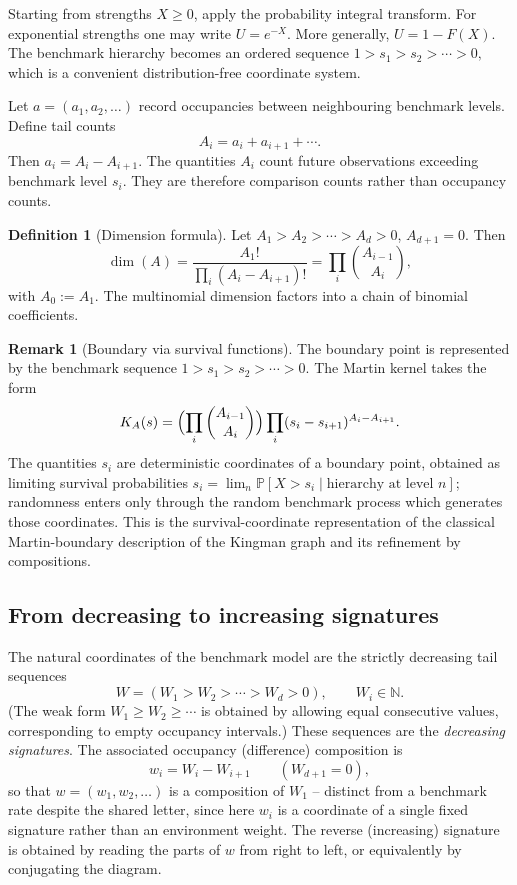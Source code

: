 \documentclass[11pt]{article}
\newcommand{\PP}{\mathbb{P}}
\theoremstyle{plain}
\theoremstyle{definition}
\newtheorem{definition}[theorem]{Definition}
\newtheorem{remark}[theorem]{Remark}
\begin{document}
Starting from strengths \(X\geq0\), apply the probability integral transform. For exponential strengths one may write \(U=e^{-X}\). More generally, \(U=1-F(X)\). The benchmark hierarchy becomes an ordered sequence
$1>s_1>s_2>\cdots>0,$
which is a convenient distribution-free coordinate system.

Let \(a=(a_1,a_2,\dots)\) record occupancies between neighbouring benchmark levels. Define tail counts
\[
A_i=a_i+a_{i+1}+\cdots.
\]
Then \(a_i=A_i-A_{i+1}\). The quantities \(A_i\) count future observations exceeding benchmark level \(s_i\). They are therefore comparison counts rather than occupancy counts.

\begin{definition}[Dimension formula]
\label{def:dimension}
Let \(A_1>A_2>\cdots>A_d>0\), \(A_{d+1}=0\). Then
\[
\dim(A)=\frac{A_1!}{\prod_i(A_i-A_{i+1})!}=\prod_i\binom{A_{i-1}}{A_i},
\]
with \(A_0:=A_1\). The multinomial dimension factors into a chain of binomial coefficients.
\end{definition}

\begin{remark}[Boundary via survival functions]
\label{rem:boundary}
The boundary point is represented by the benchmark sequence \(1>s_1>s_2>\cdots>0\). The Martin kernel takes the form
\[
K_A(s)=\Bigl(\prod_i\binom{A_{i-1}}{A_i}\Bigr)\prod_i(s_i-s_{i+1})^{A_i-A_{i+1}}.
\]
The quantities \(s_i\) are deterministic coordinates of a boundary point, obtained as limiting survival probabilities \(s_i=\lim_n\PP[X>s_i\mid\text{hierarchy at level }n]\); randomness enters only through the random benchmark process which generates those coordinates. This is the survival-coordinate representation of the classical Martin-boundary description of the Kingman graph and its refinement by compositions.
\end{remark}

\subsection{From decreasing to increasing signatures}

The natural coordinates of the benchmark model are the strictly decreasing tail sequences 
\[
W=(W_1>W_2>\cdots>W_d>0),\qquad W_i\in\mathbb{N}.
\]
(The weak form \(W_1\geq W_2\geq\cdots\) is obtained by allowing equal consecutive values, corresponding to empty occupancy intervals.) These sequences are the \emph{decreasing signatures}. The associated occupancy (difference) composition is
\[
w_i=W_i-W_{i+1}\qquad(W_{d+1}=0),
\]
so that \(w=(w_1,w_2,\dots)\) is a composition of \(W_1\) -- distinct from a benchmark rate despite the shared letter, since here \(w_i\) is a coordinate of a single fixed signature rather than an environment weight. The reverse (increasing) signature is obtained by reading the parts of \(w\) from right to left, or equivalently by conjugating the diagram.
\end{document}
